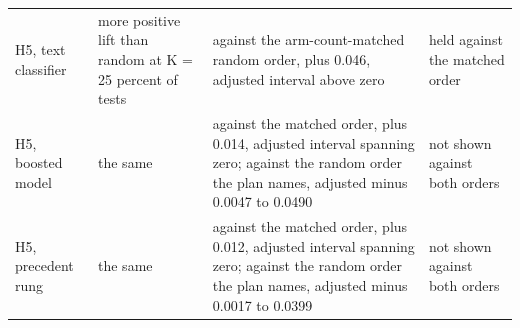 \begin{tabular}{@{}p{}p{}p{}p{}@{}}
\raggedright H5, text classifier & \raggedright more positive lift than random at K = 25 percent of tests & \raggedright against the arm-count-matched random order, plus 0.046, adjusted interval above zero & \raggedright held against the matched order \tabularnewline
\raggedright H5, boosted model & \raggedright the same & \raggedright against the matched order, plus 0.014, adjusted interval spanning zero; against the random order the plan names, adjusted minus 0.0047 to 0.0490 & \raggedright not shown against both orders \tabularnewline
\raggedright H5, precedent rung & \raggedright the same & \raggedright against the matched order, plus 0.012, adjusted interval spanning zero; against the random order the plan names, adjusted minus 0.0017 to 0.0399 & \raggedright not shown against both orders \tabularnewline

\end{tabular}
